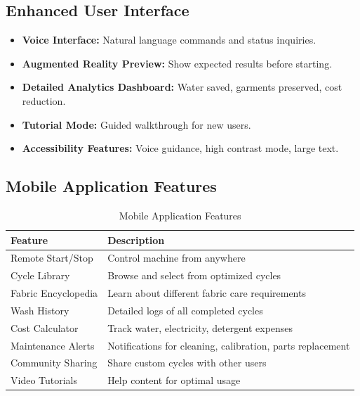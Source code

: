 \subsection{Enhanced User Interface}
\begin{itemize}
    \item \textbf{Voice Interface:} Natural language commands and status inquiries.
    \item \textbf{Augmented Reality Preview:} Show expected results before starting.
    \item \textbf{Detailed Analytics Dashboard:} Water saved, garments preserved, cost reduction.
    \item \textbf{Tutorial Mode:} Guided walkthrough for new users.
    \item \textbf{Accessibility Features:} Voice guidance, high contrast mode, large text.
\end{itemize}

\subsection{Mobile Application Features}

\begin{table}[H]
    \centering
    \small
    \begin{tabular}{|l|p{8cm}|}
        \hline
        \textbf{Feature} & \textbf{Description} \\
        \hline
        Remote Start/Stop & Control machine from anywhere \\
        \hline
        Cycle Library & Browse and select from optimized cycles \\
        \hline
        Fabric Encyclopedia & Learn about different fabric care requirements \\
        \hline
        Wash History & Detailed logs of all completed cycles \\
        \hline
        Cost Calculator & Track water, electricity, detergent expenses \\
        \hline
        Maintenance Alerts & Notifications for cleaning, calibration, parts replacement \\
        \hline
        Community Sharing & Share custom cycles with other users \\
        \hline
        Video Tutorials & Help content for optimal usage \\
        \hline
    \end{tabular}
    \caption{Mobile Application Features}
    \label{tab:mobile-features}
\end{table}

